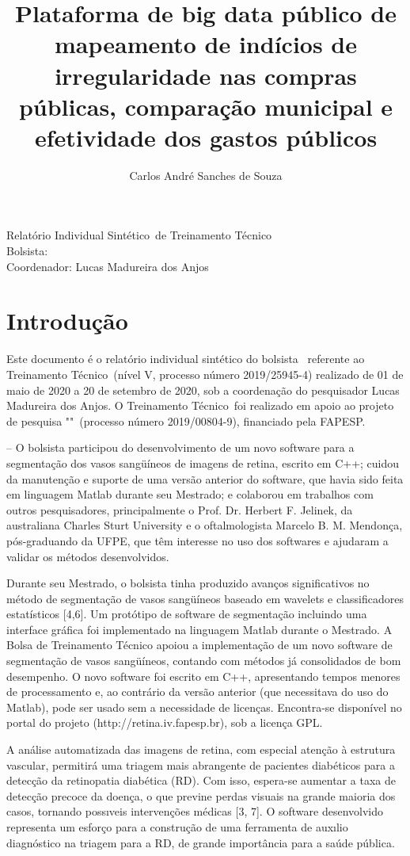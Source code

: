 \documentclass[12pt]{report}
\title{Plataforma de big data público de mapeamento de indícios de irregularidade nas compras públicas, comparação municipal e efetividade dos gastos públicos}
\author{Carlos André Sanches de Souza}
\makeatletter
\let\titulo\@title
\let\autor\@author
\newcommand{\responsavel}{Lucas Madureira dos Anjos}
\newcommand{\fomentoSigla}{FAPESP}
\newcommand{\relatorio}{Relatório Individual Sintético}
\newcommand{\projetoModalidade}{Treinamento Técnico}
\newcommand{\projetoNivel}{V}
\newcommand{\projetoNumero}{2019/25945-4}
\newcommand{\projetoVinculado}{2019/00804-9}
\newcommand{\periodoRelatorio}{01 de maio de 2020 a 20 de setembro de 2020}
\def\maketitle{
	\begin{center}
		{\Large \relatorio\ de \projetoModalidade}\\[0.5cm]
		{\large Bolsista: \autor}\\
		{\large Coordenador: \responsavel}
	\end{center}
}
\makeatother
\begin{document}


\maketitle

\chapter{Introdução}
\label{chp:introducao} 
Este documento é o relatório individual sintético do bolsista \autor\ referente ao \projetoModalidade\ (nível \projetoNivel , processo número \projetoNumero) realizado de \periodoRelatorio , sob a coordenação do pesquisador \responsavel. O \projetoModalidade\ foi realizado em apoio ao projeto de pesquisa "\titulo"\ (processo número \projetoVinculado), financiado pela \fomentoSigla.

-- O bolsista participou do desenvolvimento de um novo software para a segmentação dos vasos sangüíneos de imagens de retina, escrito em C++; cuidou da manutenção e suporte de uma versão anterior do software, que havia sido feita em linguagem Matlab durante seu Mestrado; e colaborou em trabalhos com outros pesquisadores, principalmente o Prof. Dr. Herbert F. Jelinek, da australiana Charles Sturt University e o oftalmologista Marcelo B. M. Mendonça, pós-graduando da UFPE, que têm interesse no uso dos softwares e ajudaram a validar os métodos desenvolvidos.

Durante seu Mestrado, o bolsista tinha produzido avanços significativos no método de segmentação de vasos sangüíneos baseado em wavelets e classificadores estatísticos [4,6]. Um protótipo de software de segmentação incluindo uma interface gráfica foi implementado na linguagem Matlab durante o Mestrado. A Bolsa de Treinamento Técnico apoiou a implementação de um novo software de segmentação de vasos sangüíneos, contando com métodos já consolidados de bom desempenho. O novo software foi escrito em C++, apresentando tempos menores de processamento e, ao contrário da versão anterior (que necessitava do uso do Matlab), pode ser usado sem a necessidade de licenças. Encontra-se disponível no portal do projeto (http://retina.iv.fapesp.br), sob a licença GPL.

A análise automatizada das imagens de retina, com especial atenção à estrutura vascular, permitirá uma triagem mais abrangente de pacientes diabéticos para a detecção da retinopatia diabética (RD). Com isso, espera-se aumentar a taxa de detecção precoce da doença, o que previne perdas visuais na grande maioria dos casos, tornando possıveis intervenções médicas [3, 7]. O software desenvolvido representa um esforço para a construção de uma ferramenta de auxılio diagnóstico na triagem para a RD, de grande importância para a saúde pública.
\end{document}
